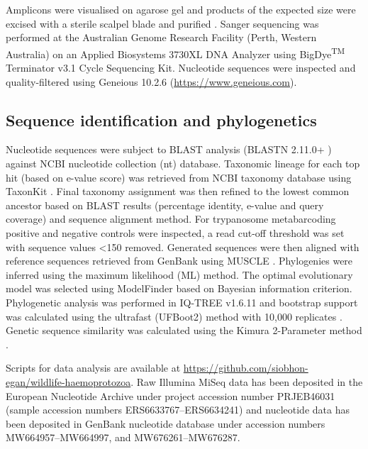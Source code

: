 \documentclass[a4paper, nobind]{templates/ociamthesis}
\begin{document}
Amplicons were visualised on agarose gel and products of the expected size were excised with a sterile scalpel blade and purified \autocite{yangSpecificQuantitativeDetection2013}.
Sanger sequencing was performed at the Australian Genome Research Facility (Perth, Western Australia) on an Applied Biosystems 3730XL DNA Analyzer using BigDye\textsuperscript{TM} Terminator v3.1 Cycle Sequencing Kit.
Nucleotide sequences were inspected and quality-filtered using Geneious 10.2.6 (\url{https://www.geneious.com}).

\hypertarget{sequence-identification-and-phylogenetics}{%
\subsection{Sequence identification and phylogenetics}\label{sequence-identification-and-phylogenetics}}

Nucleotide sequences were subject to BLAST analysis (BLASTN 2.11.0+ \autocite{zhangGreedyAlgorithmAligning2000,morgulisDatabaseIndexingProduction2008}) against NCBI nucleotide collection (nt) database.
Taxonomic lineage for each top hit (based on e-value score) was retrieved from NCBI taxonomy database using TaxonKit \autocite{weissHostReproductiveCycle2021}.
Final taxonomy assignment was then refined to the lowest common ancestor based on BLAST results (percentage identity, e-value and query coverage) and sequence alignment method.
For trypanosome metabarcoding positive and negative controls were inspected, a read cut-off threshold was set with sequence values \textless150 removed.
Generated sequences were then aligned with reference sequences retrieved from GenBank \autocite{bensonGenBank2017} using MUSCLE \autocite{edgarMUSCLEMultipleSequence2004}.
Phylogenies were inferred using the maximum likelihood (ML) method.
The optimal evolutionary model was selected using ModelFinder \autocite{kalyaanamoorthyModelFinderFastModel2017} based on Bayesian information criterion.
Phylogenetic analysis was performed in IQ-TREE v1.6.11 \autocite{nguyenIQTREEFastEffective2015} and bootstrap support was calculated using the ultrafast (UFBoot2) method with 10,000 replicates \autocite{hoangUFBoot2ImprovingUltrafast2018}.
Genetic sequence similarity was calculated using the Kimura 2-Parameter method \autocite{tamuraEstimationNumberNucleotide1993}.

Scripts for data analysis are available at \url{https://github.com/siobhon-egan/wildlife-haemoprotozoa}.
Raw Illumina MiSeq data has been deposited in the European Nucleotide Archive under project accession number PRJEB46031 (sample accession numbers ERS6633767--ERS6634241) and nucleotide data has been deposited in GenBank nucleotide database under accession numbers MW664957--MW664997, and MW676261--MW676287.
\end{document}
